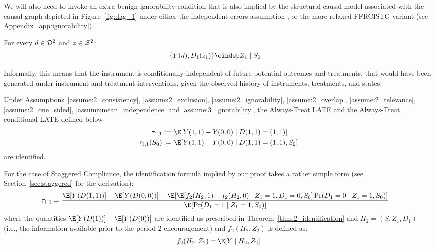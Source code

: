 We will also need to invoke an extra benign ignorability condition that is also implied by the structural causal model associated with the causal graph depicted in Figure~\ref{fig:dag_1} under either the independent errors assumption \citep{pearl1995causal}, or the more relaxed FFRCISTG variant \citep{robins1986new} (see Appendix~\ref{app:ignorability}).

\begin{assumption}\label{assume:3_ignorability}
For every $d\in {\cal D}^2$ and $z\in {\cal Z}^2$:
\begin{align*}
    \{Y(d), D_1(z_1)\} \cindep& Z_1 \mid S_0
\end{align*}
\end{assumption}
\noindent Informally, this means that the instrument is conditionally independent of future potential outcomes and treatments, that would have been generated under instrument and treatment interventions, given the observed history of instruments, treatments, and states.

\begin{theorem}\label{thm:late11_id}
    Under Assumptions~\ref{assume:2_consistency}, 
 \ref{assume:2_exclusion},
 \ref{assume:2_ignorability}, \ref{assume:2_overlap}, \ref{assume:2_relevance}, \ref{assume:2_one_sided}, \ref{assume:mean_independence} and \ref{assume:3_ignorability}, the Always-Treat LATE and the Always-Treat conditional LATE defined below
    \begin{align}
        \tau_{1,1} :=~& \E[Y(1,1) - Y(0,0)\mid D(1,1)=(1,1)]\\
        \tau_{1,1}(S_0):=~& \E[Y(1,1) - Y(0,0)\mid D(1,1)=(1,1), S_0]
    \end{align}
    are identified.
\end{theorem}

For the case of Staggered Compliance, the identification formula implied by our proof takes a rather simple form (see Section~\ref{sec:staggered} for the derivation):
\begin{align*}
    \tau_{1,1} =~& \frac{\E[Y(D(1,1))] - \E[Y(D(0,0))] - \E[\E[f_2(H_2, 1)-f_2(H_2,0)\mid Z_1=1, D_1=0, S_0]\Pr(D_1=0\mid Z_1=1, S_0)]}{\E[\Pr(D_1=1\mid Z_1=1, S_0)]} 
\end{align*}
where the quantities $\E[Y(D(1))] - \E[Y(D(0))]$ are identified as prescribed in Theorem~\ref{thm:2_identification} and $H_2=(S, Z_1, D_1)$ (i.e., the information available prior to the period $2$ encouragement) and $f_2(H_2,Z_2)$ is defined as:
\begin{align*}
    f_2(H_2, Z_2) = \E[Y\mid H_2, Z_2]
\end{align*}

